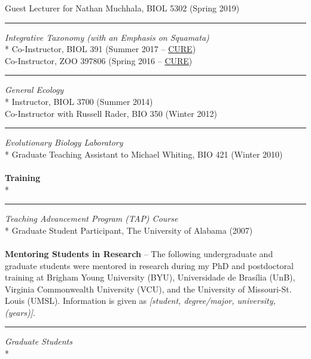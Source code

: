 \documentclass[margin,line]{res}
\begin{document}
\begin{resume}
\hspace*{8mm} Guest Lecturer for Nathan Muchhala, BIOL 5302 (Spring 2019)\\
\rule{-1mm}{5mm} \hspace*{4mm} {\textit{Integrative Taxonomy (with an Emphasis on Squamata)}}\\*
\hspace*{8mm} Co-Instructor, BIOL 391 (Summer 2017 -- \href{https://sites.nationalacademies.org/cs/groups/dbassesite/documents/webpage/dbasse_177288.pdf}{CURE})\\
\hspace*{8mm} Co-Instructor, ZOO 397806 (Spring 2016 -- \href{https://sites.nationalacademies.org/cs/groups/dbassesite/documents/webpage/dbasse_177288.pdf}{CURE})\\
\rule{-1mm}{5mm} \hspace*{4mm} {\textit{General Ecology}}\\*
\hspace*{8mm} Instructor, BIOL 3700 (Summer 2014)\\
\hspace*{8mm} Co-Instructor with Russell Rader, BIO 350 (Winter 2012)\\
\rule{-1mm}{5mm} \hspace*{4mm} {\textit{Evolutionary Biology Laboratory}}\\*
\hspace*{8mm} Graduate Teaching Assistant to Michael Whiting, BIO 421 (Winter 2010)\\
~\\
\textbf{Training}\\*
\rule{-1mm}{5mm} \hspace*{4mm} {\textit{Teaching Advancement Program (TAP) Course}}\\*
\hspace*{8mm} Graduate Student Participant, The University of Alabama (2007)\\
~\\
\textbf{Mentoring Students in Research} -- 
The following undergraduate and graduate students were mentored in research during my PhD and postdoctoral training at Brigham Young University (BYU), Universidade de Bras\'{i}lia (UnB), Virginia Commonwealth University (VCU), and the University of Missouri-St. Louis (UMSL). Information is given as \textit{[student, degree/major, university, (years)]}.~\\
\rule{-1mm}{5mm} \hspace*{4mm} {\textit{Graduate Students}}\\*

\end{resume}
\end{document}
